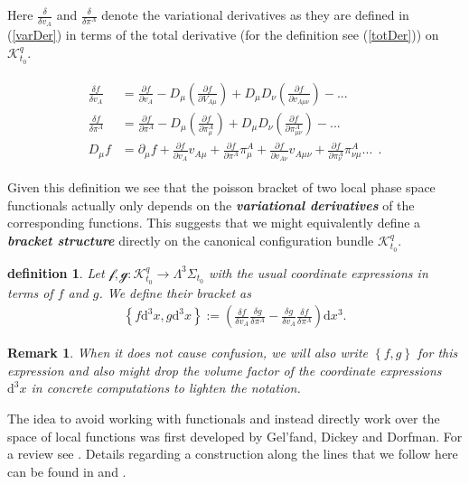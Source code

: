 \documentclass[a4paper,12pt, DIV=14, BCOR=5mm, twoside, headsepline, numbers=noenddot]{scrbook}
\newtheorem{definition}{definition}[section]
\newtheorem*{remark}{Remark}
\begin{document}
Here $\frac{\delta}{\delta v_A}$ and $\frac{\delta}{\delta \pi^A}$ denote the variational derivatives as they are defined in (\ref{varDer}) in terms of the total derivative (for the definition see (\ref{totDer})) on $\mathcal{K}^q_{t_0}$.

\begin{align}
    \begin{aligned}
    \frac{\delta f}{\delta v_A} &= \frac{\partial f}{\partial v_A} - D_{\mu}(\frac{\partial f}{\partial V_{A\mu}}) + D_{\mu}D_{\nu} (\frac{\partial f}{\partial v_{A\mu\nu}}) - ... \\
    \frac{\delta f}{\delta \pi^A} &= \frac{\partial f}{\partial \pi^A} - D_{\mu}(\frac{\partial f}{\partial \pi^{A}_{\mu}}) + D_{\mu}D_{\nu} (\frac{\partial f}{\partial \pi^{A}_{\mu\nu}}) - ... \\
    D_\mu f &= \partial _\mu f + \frac{\partial f}{\partial v_A} v_{A\mu} + \frac{\partial f}{\partial \pi^A } \pi ^{A}_{ \mu} + \frac{\partial f}{\partial v_{A\nu}} v_{A\mu \nu} + \frac{\partial f}{\partial \pi^{A}_ {\nu}}\pi^{A}_{ \nu \mu} ... \ \ .
    \end{aligned}
\end{align}

Given this definition we see that the poisson bracket of two local phase space functionals actually only depends on the \textit{\textbf{variational derivatives}} of the corresponding functions. This suggests that we might equivalently define a \textit{\textbf{bracket structure}} directly on the canonical configuration bundle $\mathcal{K}^q_{t_0}$.
\begin{definition}
Let $\mathcal{f},\mathcal{g} : \mathcal{K}^q_{t_0} \rightarrow \Lambda^3\Sigma_{t_0} $ with the usual coordinate expressions in terms of $f$ and $g$. We define their bracket as 
\begin{align}
    \left \{ f \mathrm{d}^3x,g\mathrm{d}^3x\right \} := \left ( \frac{\delta f}{\delta v_A} \frac{\delta g}{\delta \pi^A} - \frac{\delta g}{\delta v_A} \frac{\delta f}{\delta \pi^A} \right ) \mathrm{d}x^3  .
\end{align}
\end{definition}
\begin{remark}
When it does not cause confusion, we will also write $\left \{ f ,g\right \}$ for this expression and also might drop the volume factor of the coordinate expressions $\mathrm{d}^3x$ in concrete computations to lighten the notation. 
\end{remark}
The idea to avoid working with functionals and instead directly work over the space of local functions was first developed by Gel'fand, Dickey and Dorfman. For a review see \cite{doi:10.1142/5108}.
Details regarding a construction along the lines that we follow here can be found in \cite{1997hep.th....9164B} and \cite{Barnich1998}. 
\end{document}
